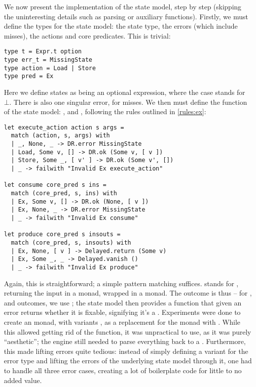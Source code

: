 We now present the implementation of the \Ex{} state model, step by step (skipping the uninteresting details such as parsing or auxiliary functions). Firstly, we must define the types for the state model: the state type, the errors (which include misses), the actions and core predicates. This is trivial: \begin{lstlisting}
type t = Expr.t option
type err_t = MissingState
type action = Load | Store
type pred = Ex
\end{lstlisting}
Here we define states as being an optional expression, where the  case stands for $\bot$. There is also one singular error, for misses. We then must define the function of the state model: \execac, \consume{} and \produce, following the rules outlined in \cref{rules:ex}: \begin{lstlisting}
let execute_action action s args =
  match (action, s, args) with
  | _, None, _ -> DR.error MissingState
  | Load, Some v, [] -> DR.ok (Some v, [ v ])
  | Store, Some _, [ v' ] -> DR.ok (Some v', [])
  | _ -> failwith "Invalid Ex execute_action"

let consume core_pred s ins =
  match (core_pred, s, ins) with
  | Ex, Some v, [] -> DR.ok (None, [ v ])
  | Ex, None, _ -> DR.error MissingState
  | _ -> failwith "Invalid Ex consume"

let produce core_pred s insouts =
  match (core_pred, s, insouts) with
  | Ex, None, [ v ] -> Delayed.return (Some v)
  | Ex, Some _, _ -> Delayed.vanish ()
  | _ -> failwith "Invalid Ex produce"
\end{lstlisting}
Again, this is straightforward; a simple pattern matching suffices.  stands for \mbox{}, returning the input in a  monad, wrapped in a  monad. The outcome is thus \Ok{} -- for \Err{}, \LFail{} and \Miss{} outcomes, we use ; the state model then provides a  function that given an error returns whether it is fixable, signifying it's a \Miss. Experiments were done to create an  monad, with variants , as a replacement for the  monad with . While this allowed getting rid of the  function, it was unpractical to use, as it was purely ``aesthetic''; the engine still needed to parse everything back to a . Furthermore, this made lifting errors quite tedious: instead of simply defining a variant  for the error type and lifting the errors of the underlying state model through it, one had to handle all three error cases, creating a lot of boilerplate code for little to no added value.

